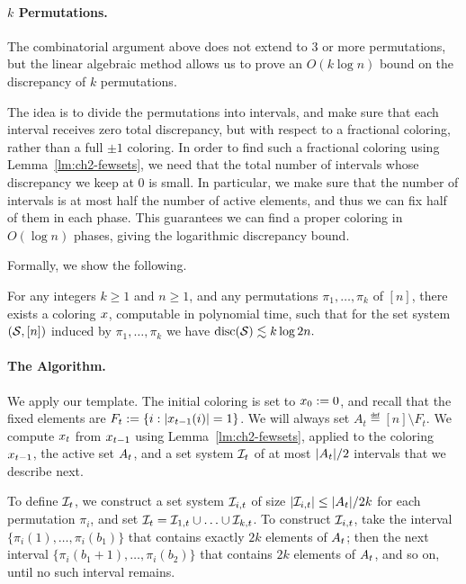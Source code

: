 
\paragraph{$k$ Permutations.}
The combinatorial argument above does not extend to \(3\) or more
permutations, but the linear algebraic method allows us to prove an \(O(k \log n)\) bound on the discrepancy of \(k\)
permutations. 

The idea is to divide the permutations into intervals, and
make sure that each interval receives zero total discrepancy, but with respect to a fractional coloring, rather than a full \(\pm 1\)
coloring. In order to find such a fractional coloring using
Lemma~\ref{lm:ch2-fewsets}, we need that the total number of intervals whose discrepancy we keep at \(0\) is small. In particular, we make sure that the number of intervals is at most half the number of active elements, and thus we can fix half of them in each phase. This guarantees we can find a proper coloring in $O(\log n)$ phases, giving the logarithmic discrepancy bound. 

Formally, we show the following.

\begin{theorem}\label{thm:ch2-kperm}
  For any integers \(k \ge 1\) and \(n\ge 1\), and any permutations \(\pi_1,
  \ldots, \pi_k\) of \([n]\), there exists a coloring \(x\),
  computable in polynomial time, such that for the set system \((\mathcal{S},
  [n])\) induced by \(\pi_1, \ldots, \pi_k\) we have
  \(
  \operatorname{disc}(\mathcal{S}) \lesssim k \log 2n.
  \)
\end{theorem}

\paragraph{The Algorithm.} We apply our template. The initial coloring is set to \(x_0 := 0\), and recall that the fixed elements are $F_t := \{i: |x_{t-1}(i)| = 1\}$. We will always set $A_t \eqdef [n]\setminus F_t$. We compute $x_t$ from $x_{t-1}$ using Lemma~\ref{lm:ch2-fewsets}, applied to the coloring $x_{t-1}$, the active set $A_t$, and a set system $\mathcal{I}_t$ of at most $|A_t|/2$ intervals that we describe next.

To define $\mathcal{I}_t$,  we construct a set system \(\mathcal{I}_{i,t}\) of size \(|\mathcal{I}_{i,t}| \le |A_t|/2k\) for each permutation \(\pi_i\), and set \(\mathcal{I}_t = \mathcal{I}_{1,t} \cup \ldots \cup \mathcal{I}_{k,t}\). To construct \(\mathcal{I}_{i,t}\), take the interval \(\{\pi_i(1), \ldots, \pi_i(b_1)\}\) that contains exactly \(2k\) elements of \(A_t\); then the next interval \(\{\pi_i(b_1+1), \ldots, \pi_i(b_2)\}\) that contains \(2k\) elements of \(A_t\), and so on, until no such interval remains.

